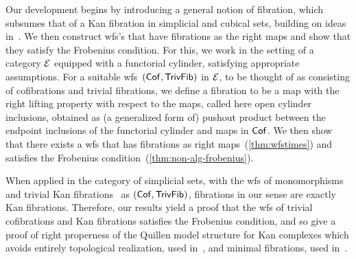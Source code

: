 \documentclass[reqno,10pt,a4paper,oneside,draft]{amsart}
\begin{document}
Our development begins by introducing a general notion of fibration, which subsumes that of a Kan fibration in simplicial and cubical sets, building on ideas in~\cite{cisinski-asterisque}.
We then construct wfs's that have fibrations as the right maps and show that they satisfy the Frobenius condition.
For this, we work in the setting of a category $\cal{E}$ equipped with a functorial cylinder, satisfying appropriate assumptions.
For a suitable wfs~$(\Cof, \TrivFib)$ in $\cal{E}$, to be thought of as consisting of cofibrations and trivial fibrations, we define a fibration to be a map with the right lifting property with respect to the maps, called here open cylinder inclusions, obtained as (a generalized form of) pushout product between the endpoint inclusions of the functorial cylinder and maps in $\Cof$.
We then show that there exists a wfs that has fibrations as right maps~(\cref{thm:wfstimes}) and satisfies the Frobenius condition~(\cref{thm:non-alg-frobenius}).

When applied in the category of simplicial sets, with the wfs of monomorphisms and trivial Kan fibrations~\cite{quillen-homotopical} as $(\Cof, \TrivFib)$, fibrations in our sense are exactly Kan fibrations.
Therefore, our results yield a proof that the wfs of trivial cofibrations and Kan fibrations satisfies the Frobenius condition, and so give a proof of right properness of the Quillen model structure for Kan complexes which avoids entirely topological realization, used in~\cite{hovey-model-categories}, and minimal fibrations, used in~\cite{joyal-tierney:simplicial-homotopy-theory}.
\end{document}
